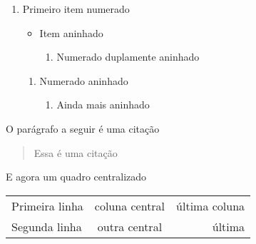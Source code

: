 \documentclass[dsc,male,12pt,a4paper]{ita}
\begin{document}
\begin{enumerate}
	\item Primeiro item numerado
	      \begin{itemize}
		      \item Item aninhado
		            \begin{enumerate}
			            \item Numerado duplamente aninhado
		            \end{enumerate}
	      \end{itemize}
	      \begin{enumerate}
		      \item Numerado aninhado
		            \begin{enumerate}
			            \item Ainda mais aninhado
		            \end{enumerate}
	      \end{enumerate}
\end{enumerate}


O parágrafo a seguir é uma citação
\begin{quotation}
	Essa é uma citação \cite{sacksBIMHandbookGuide2018}
\end{quotation}

E agora um quadro centralizado
\begin{center}
	\begin{tabular}{l|c|r}
		\hline
		Primeira linha & coluna central & última coluna \\
		Segunda linha  & outra central  & última        \\
		\hline
	\end{tabular}
\end{center}

\printbibliography
\end{document}
